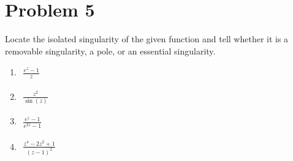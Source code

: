 \documentclass[11pt]{article}
\begin{document}
\section{Problem 5}
Locate the isolated singularity of the given function and tell whether it is a removable singularity, a pole, or an essential singularity.
\begin{enumerate}[label=\textbf{(\alph*)}]
    \item
          \begin{flushleft}
              $\begin{aligned}
                      \frac{e^{z}-1}{z}
                  \end{aligned}$
          \end{flushleft}
    \item
          \begin{flushleft}
              $\begin{aligned}
                      \frac{z^{2}}{\sin(z)}
                  \end{aligned}$
          \end{flushleft}
    \item
          \begin{flushleft}
              $\begin{aligned}
                      \frac{e^{z}-1}{e^{2z}-1}
                  \end{aligned}$
          \end{flushleft}
    \item
          \begin{flushleft}
              $\begin{aligned}
                      \frac{z^{4}-2z^{2}+1}{(z-1)^{2}}
                  \end{aligned}$
          \end{flushleft}
\end{enumerate}
\end{document}
